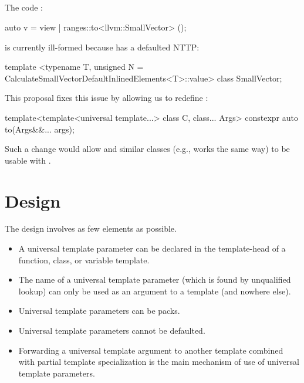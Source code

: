 \documentclass{wg21}
\begin{document}
\subsection{}

The code :

\begin{colorblock}
auto v = view | ranges::to<llvm::SmallVector> ();
\end{colorblock}

is currently ill-formed because  has a defaulted NTTP:

\begin{colorblock}
template <typename T, unsigned N = CalculateSmallVectorDefaultInlinedElements<T>::value>
class SmallVector;
\end{colorblock}

This proposal fixes this issue by allowing us to redefine :

\begin{colorblock}
template<template<universal template...> class C, class... Args>
constexpr auto to(Args&&... args);
\end{colorblock}

Such a change would allow  and similar classes (e.g.,  works the same way) to be usable with .

\section{Design}

The design involves as few elements as possible.

\begin{itemize}
\item A universal template parameter can be declared in the template-head of a function, class, or variable template.
\item The name of a universal template parameter (which is found by unqualified lookup) can only be used as an argument to a template (and nowhere else).
\item Universal template parameters can be packs.
\item Universal template parameters cannot be defaulted.
\item Forwarding a universal template argument to another template combined with partial template specialization is the main mechanism of use of universal template parameters.
\end{itemize}
\end{document}
